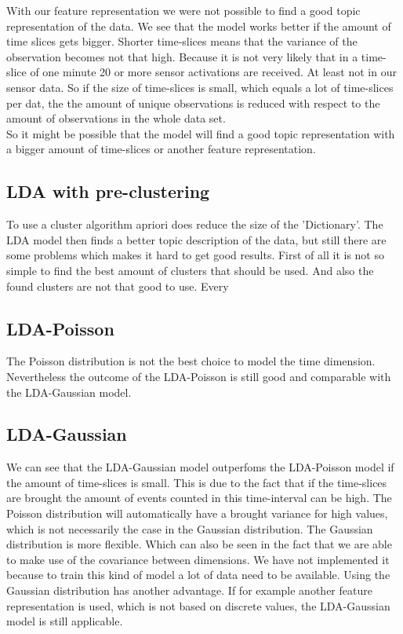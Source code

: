 \documentclass[a4paper,fleqn]{article}
\begin{document}
With our feature representation we were not possible to find a good topic representation of the data. We see that the model works better if the amount of time slices gets bigger. Shorter time-slices means that the variance of the observation becomes not that high. Because it is not very likely that in a time-slice of one minute 20 or more sensor activations are received. At least not in our sensor data.  So if the size of time-slices is small, which equals a lot of time-slices per dat, the the amount of unique observations is reduced with respect to the amount of observations in the whole data set.\\
So it might be possible that the model will find a good topic representation with a bigger amount of time-slices or another feature representation.

\subsection{LDA with pre-clustering}
To use a cluster algorithm apriori does reduce the size of the 'Dictionary'. The LDA model then finds a better topic description of the data, but still there are some problems which makes it hard to get good results. First of all it is not so simple to find the best amount of clusters that should be used. And also the found clusters are not that good to use. Every 

\subsection{LDA-Poisson}
The Poisson distribution is not the best choice to model the time dimension. Nevertheless the outcome of the LDA-Poisson is still good and comparable with the LDA-Gaussian model.

\subsection{LDA-Gaussian}
We can see that the LDA-Gaussian model outperfoms the LDA-Poisson model if the amount of time-slices is small. This is due to the fact that if the time-slices are brought the amount of events counted in this time-interval can be high. The Poisson distribution will automatically have a brought variance for high values, which is not necessarily the case in the Gaussian distribution. The Gaussian distribution is more flexible. Which can also be seen in the fact that we are able to make use of the covariance between dimensions. We have not implemented it because to train this kind of model a lot of data need to be available.
Using the Gaussian distribution has another advantage. If for example another feature representation is used, which is not based on discrete values, the LDA-Gaussian model is still applicable.
\\
\end{document}
